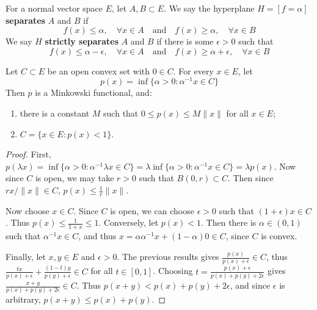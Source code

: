 \begin{defn} For a normal vector space $E$, let $A,B\subset E$. We say the hyperplane $H=[f=\alpha]$ \textbf{separates} $A$ and $B$ if
\begin{equation}
f(x)\leq \alpha,\quad \forall x\in A\quad \textrm{and}\quad f(x)\geq \alpha,\quad \forall x\in B
\end{equation}
We say $H$ \textbf{strictly separates} $A$ and $B$ if there is some $\epsilon>0$ such that
\begin{equation}
f(x)\leq \alpha-\epsilon,\quad \forall x\in A\quad \textrm{and}\quad f(x)\geq \alpha+\epsilon,\quad \forall x\in B
\end{equation}
\end{defn}

\begin{lemma} Let $C\subset E$ be an open convex set with $0\in C$. For every $x\in E$, let
\begin{equation}
p(x)=\inf\{\alpha>0:\alpha^{-1} x \in C\}
\end{equation}
Then $p$ is a Minkowski functional, and:
\begin{enumerate}
\item there is a constant $M$ such that $0\leq p(x)\leq M\|x\|$ for all $x\in E$;
\item $C=\{x\in E:p(x)<1\}$.
\end{enumerate}
\end{lemma}
\begin{proof}
First, $p(\lambda x)=\inf\{\alpha>0:\alpha^{-1}\lambda x\in C\}= \lambda\inf\{\alpha>0:\alpha^{-1}x\in C\}=\lambda p(x)$. Now since $C$ is open, we may take $r>0$ such that $B(0,r)\subset C$. Then since $rx/\|x\|\in C$, $p(x)\leq \frac{1}{r}\|x\|$.

Now choose $x\in C$. Since $C$ is open, we can choose $\epsilon>0$ such that $(1+\epsilon)x\in C$. Thus $p(x)\leq \frac{1}{1+x}\leq 1$. Conversely, let $p(x)<1$. Then there is $\alpha\in (0,1)$ such that $\alpha^{-1} x\in C$, and thus $x=\alpha \alpha^{-1} x+(1-\alpha) 0\in C$, since $C$ is convex. 

Finally, let $x,y\in E$ and $\epsilon>0$. The previous results gives $\frac{p(x)}{p(x)+\epsilon}\in C$, thus $\frac{tx}{p(x)+\epsilon}+\frac{(1-t)y}{p(y)+\epsilon}\in C$ for all $t\in [0,1]$. Choosing $t=\frac{p(x)+\epsilon}{p(x)+p(y)+2\epsilon}$ gives $\frac{x+y}{p(x)+p(y)+2\epsilon}\in C$. Thus $p(x+y)<p(x)+p(y)+2\epsilon$, and since $\epsilon$ is arbitrary, $p(x+y)\leq p(x)+p(y)$.
\end{proof}

